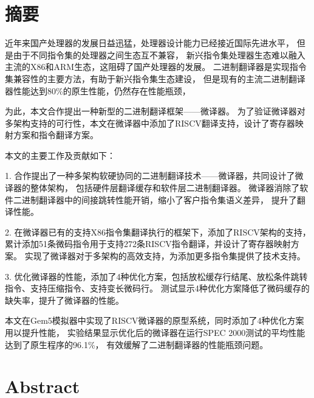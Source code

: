 \maketitle%
\MAKETITLE%
\makedeclaration%
\intobmk\chapter*{摘\quad 要}%
\setcounter{page}{1}%

近年来国产处理器的发展日益迅猛，处理器设计能力已经接近国际先进水平，
但是由于不同指令集的处理器之间生态互不兼容，
新兴指令集处理器生态难以融入主流的X86和ARM生态，这阻碍了国产处理器的发展。
二进制翻译器是实现指令集兼容性的主要方法，有助于新兴指令集生态建设，
但是现有的主流二进制翻译器性能达到80\%的原生性能，仍然存在性能瓶颈，

为此，本文合作提出一种新型的二进制翻译框架——微译器。
为了验证微译器对多架构支持的可行性，本文在微译器中添加了RISCV翻译支持，设计了寄存器映射方案和指令翻译方案。

本文的主要工作及贡献如下：

1. 合作提出了一种多架构软硬协同的二进制翻译技术——微译器，共同设计了微译器的整体架构，
包括硬件层翻译缓存和软件层二进制翻译器。
微译器消除了软件二进制翻译器中的间接跳转性能开销，缩小了客户指令集语义差异，
提升了翻译性能。

2. 在微译器已有的支持X86指令集翻译执行的框架下，添加了RISCV架构的支持，
累计添加51条微码指令用于支持272条RISCV指令翻译，并设计了寄存器映射方案。
实现了微译器对于多架构的高效支持，为添加更多指令集提供了技术支持。

3. 优化微译器的性能，添加了4种优化方案，包括放松缓存行结尾、放松条件跳转指令、支持压缩指令、支持变长微码行。
测试显示4种优化方案降低了微码缓存的缺失率，提升了微译器的性能。

本文在Gem5模拟器中实现了RISCV微译器的原型系统，同时添加了4种优化方案用以提升性能，
实验结果显示优化后的微译器在运行SPEC 2000测试的平均性能达到了原生程序的96.1\%，
有效缓解了二进制翻译器的性能瓶颈问题。

\intobmk\chapter*{Abstract}%

